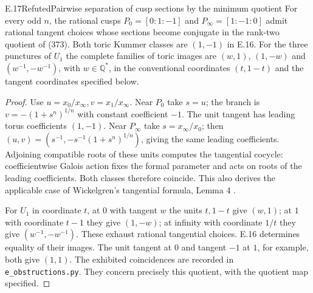 \begin{statement}{E.17}{Refuted}{Pairwise separation of cusp sections by the minimum quotient}
For every odd $n$, the rational cusps
$P_0=[0:1:-1]$ and $P_\infty=[1:-1:0]$ admit rational
tangent choices whose sections become conjugate in
the rank-two quotient of (373). Both toric Kummer
classes are $(1,-1)$ in E.16. For the three punctures
of $U_1$ the complete families of toric images are
$(w,1)$, $(1,-w)$ and $(w^{-1},-w^{-1})$, with
$w\in\mathbb Q^*$, in the conventional coordinates
$(t,1-t)$ and the tangent coordinates specified below.
\end{statement}
\begin{proof}
Use $u=x_0/x_\infty,v=x_1/x_\infty$. Near $P_0$
take $s=u$; the branch is
$v=-(1+s^n)^{1/n}$ with constant coefficient $-1$.
The unit tangent has leading torus coefficients
$(1,-1)$. Near $P_\infty$ take $s=x_\infty/x_0$;
then $(u,v)=(s^{-1},-s^{-1}(1+s^n)^{1/n})$,
giving the same leading coefficients. Adjoining
compatible roots of these units computes the
tangential cocycle: coefficientwise Galois action
fixes the formal parameter and acts on roots of
the leading coefficients. Both classes therefore
coincide. This also derives the applicable case of
Wickelgren's tangential formula, Lemma 4
\cite{E_Wickelgren}.

For $U_1$ in coordinate $t$, at $0$ with tangent
$w$ the units $t,1-t$ give $(w,1)$; at $1$ with
coordinate $t-1$ they give $(1,-w)$; at infinity
with coordinate $1/t$ they give
$(w^{-1},-w^{-1})$. These exhaust rational
tangential choices. E.16 determines equality of
their images. The unit tangent at $0$ and tangent
$-1$ at $1$, for example, both give $(1,1)$.
The exhibited coincidences are recorded in
\texttt{e\_obstructions.py}. They concern precisely
this quotient, with the quotient map specified.
\end{proof}

